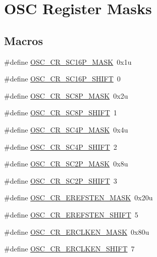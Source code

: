 \hypertarget{group___o_s_c___register___masks}{}\section{O\+SC Register Masks}
\label{group___o_s_c___register___masks}
\subsection*{Macros}
\begin{DoxyCompactItemize}
\item 
\#define \hyperlink{group___o_s_c___register___masks_ga8c73f0e22875a434f8031986a9e5f8b4}{O\+S\+C\+\_\+\+C\+R\+\_\+\+S\+C16\+P\+\_\+\+M\+A\+SK}~0x1u
\item 
\#define \hyperlink{group___o_s_c___register___masks_ga4bcf6535cd7e7c4ff935f6b544ca3f9a}{O\+S\+C\+\_\+\+C\+R\+\_\+\+S\+C16\+P\+\_\+\+S\+H\+I\+FT}~0
\item 
\#define \hyperlink{group___o_s_c___register___masks_ga1a5a0db08efaf66c34caf98136cbec11}{O\+S\+C\+\_\+\+C\+R\+\_\+\+S\+C8\+P\+\_\+\+M\+A\+SK}~0x2u
\item 
\#define \hyperlink{group___o_s_c___register___masks_ga6f17376a1571a200e55cac51d1358503}{O\+S\+C\+\_\+\+C\+R\+\_\+\+S\+C8\+P\+\_\+\+S\+H\+I\+FT}~1
\item 
\#define \hyperlink{group___o_s_c___register___masks_ga18f4104a5a6c0d94f0592ee06732fe03}{O\+S\+C\+\_\+\+C\+R\+\_\+\+S\+C4\+P\+\_\+\+M\+A\+SK}~0x4u
\item 
\#define \hyperlink{group___o_s_c___register___masks_gab1724a5b1e96efb22e48a9478ae8cf25}{O\+S\+C\+\_\+\+C\+R\+\_\+\+S\+C4\+P\+\_\+\+S\+H\+I\+FT}~2
\item 
\#define \hyperlink{group___o_s_c___register___masks_ga94a8b0e48d18793bde1a3aaaea44b92c}{O\+S\+C\+\_\+\+C\+R\+\_\+\+S\+C2\+P\+\_\+\+M\+A\+SK}~0x8u
\item 
\#define \hyperlink{group___o_s_c___register___masks_ga0ec9adaf1ca3ec309f1a2c2fd37d3f4d}{O\+S\+C\+\_\+\+C\+R\+\_\+\+S\+C2\+P\+\_\+\+S\+H\+I\+FT}~3
\item 
\#define \hyperlink{group___o_s_c___register___masks_ga3024913f44011d333c6f48ddb00fbf9d}{O\+S\+C\+\_\+\+C\+R\+\_\+\+E\+R\+E\+F\+S\+T\+E\+N\+\_\+\+M\+A\+SK}~0x20u
\item 
\#define \hyperlink{group___o_s_c___register___masks_gac1b9c5d7f156f1792255204dae816aba}{O\+S\+C\+\_\+\+C\+R\+\_\+\+E\+R\+E\+F\+S\+T\+E\+N\+\_\+\+S\+H\+I\+FT}~5
\item 
\#define \hyperlink{group___o_s_c___register___masks_gab96140627de270278cbdfc81fbef63fc}{O\+S\+C\+\_\+\+C\+R\+\_\+\+E\+R\+C\+L\+K\+E\+N\+\_\+\+M\+A\+SK}~0x80u
\item 
\#define \hyperlink{group___o_s_c___register___masks_ga56f4aa6f215268327accda5434671187}{O\+S\+C\+\_\+\+C\+R\+\_\+\+E\+R\+C\+L\+K\+E\+N\+\_\+\+S\+H\+I\+FT}~7
\end{DoxyCompactItemize}


